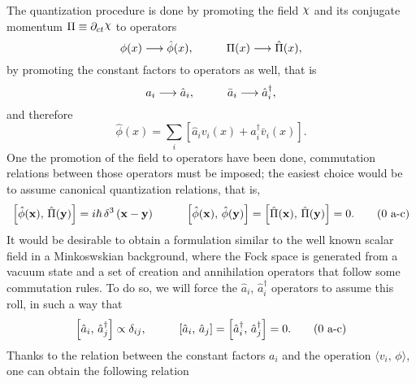 The quantization procedure is done by promoting the field $\rchi$ and its conjugate momentum $\Pi\equiv\partial_{ct}\rchi$ to operators
\begin{equation}
	\phi(x)\longrightarrow\hat{\phi}(x),\hspace{1.0cm}\Pi(x)\longrightarrow\hat{\Pi}(x),
\end{equation}
by promoting the constant factors to operators as well, that is
\begin{equation}
	a_i\longrightarrow\hat{a}_i,\hspace{1.0cm}\bar a_i\longrightarrow\hat{a}_i^\dagger,
\end{equation}
and therefore
\begin{equation}
	\hat{\phi}(x)=\sum_i\left[\hat{a}_iv_i(x)+\hat{a}_i^\dagger \bar v_i(x)\right].
\end{equation}
One the promotion of the field to operators have been done, commutation relations between those operators must be imposed; the easiest choice would be to assume canonical quantization relations, that is,
\begin{subequations}\label{eq: General canonical commutator}
	\begin{gather}
		\left[\hat{\phi}(\mathbf{x}),\,\hat{\Pi}(\mathbf{y})\right]=i\hbar \,\delta^3\left(\mathbf{x}-\mathbf{y}\right)\hspace{1.0cm}\left[\hat{\phi}(\mathbf{x}),\,\hat{\phi}(\mathbf{y})\right]=\left[\hat{\Pi}(\mathbf{x}),\,\hat{\Pi}(\mathbf{y})\right]=0.\tag{\theequation \,\,a-c}
	\end{gather}
\end{subequations}
It would be desirable to obtain a formulation similar to the well known scalar field in a Minkoswskian background, where the Fock space is generated from a vacuum state and a set of creation and annihilation operators that follow some commutation rules. To do so, we will force the $\hat{a}_i,\,\hat{a}^\dagger_i$ operators to assume this roll, in such a way that
\begin{subequations}\label{eq: general a operator commutator rules}
	\begin{gather}
		\left[\hat{a}_i,\,\hat{a}_j^\dagger\right]\propto \delta_{ij},\hspace{1.0cm}\left[\hat{a}_i,\,\hat{a}_j\right]=\left[\hat{a}_i^\dagger,\,\hat{a}_j^\dagger\right]=0.\tag{\theequation \,\,a-c}
	\end{gather}
\end{subequations}
Thanks to the relation between the constant factors $a_i$ and the operation $\langle v_i,\,\phi\rangle$, one can obtain the following relation
